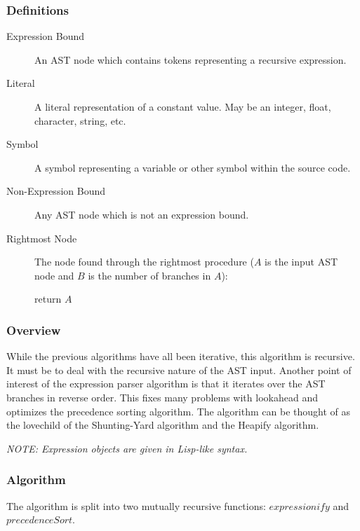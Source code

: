 \documentclass[10pt,a4paper]{article}
\begin{document}
\subsubsection{Definitions}
\begin{description}
\item[Expression Bound] An AST node which contains tokens representing a recursive expression.
\item[Literal] A literal representation of a constant value. May be an integer, float, character, string, etc.
\item[Symbol] A symbol representing a variable or other symbol within the source code.
\item[Non-Expression Bound] Any AST node which is not an expression bound.
\item[Rightmost Node] The node found through the rightmost procedure ($A$ is the input AST node and $B$ is the number of branches in $A$):\newline
	\begin{algorithm}[H]
	\caption{$rightmost(A)$}

	 {
		return $A$\;
	}
	\end{algorithm}
\end{description}

\subsubsection{Overview}
While the previous algorithms have all been iterative, this algorithm is recursive. It must be to deal with the recursive nature of the AST input. Another point of interest of the expression parser algorithm is that it iterates over the AST branches in reverse order. This fixes many problems with lookahead and optimizes the precedence sorting algorithm. The algorithm can be thought of as the lovechild of the Shunting-Yard algorithm and the Heapify algorithm.

\textit{NOTE: Expression objects are given in Lisp-like syntax.}

\subsubsection{Algorithm}
The algorithm is split into two mutually recursive functions: $expressionify$ and $precedenceSort$.
\end{document}
